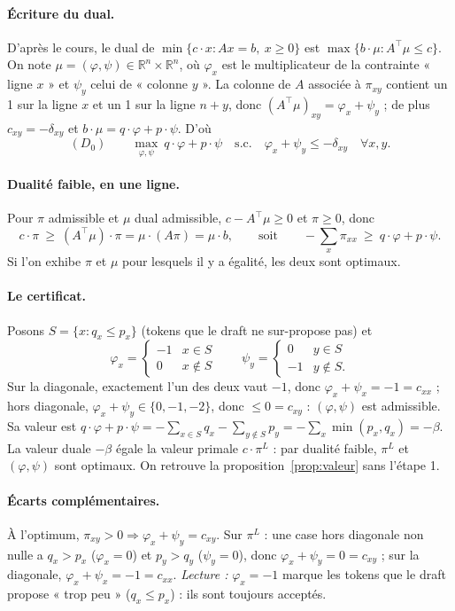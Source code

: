 \documentclass[11pt,a4paper]{article}
\newcommand{\R}{\mathbb{R}}
\theoremstyle{plain}
\theoremstyle{definition}
\begin{document}
\paragraph{Écriture du dual.} D'après le cours, le dual de $\min\{c\cdot x:Ax=b,\ x\ge0\}$ est $\max\{b\cdot\mu:A^\top\mu\le c\}$. On note $\mu=(\varphi,\psi)\in\R^n\times\R^n$, où $\varphi_x$ est le multiplicateur de la contrainte « ligne $x$ » et $\psi_y$ celui de « colonne $y$ ». La colonne de $A$ associée à $\pi_{xy}$ contient un 1 sur la ligne $x$ et un 1 sur la ligne $n+y$, donc $(A^\top\mu)_{xy}=\varphi_x+\psi_y$ ; de plus $c_{xy}=-\delta_{xy}$ et $b\cdot\mu=q\cdot\varphi+p\cdot\psi$. D'où
\[(D_0)\qquad \max_{\varphi,\psi}\ q\cdot\varphi+p\cdot\psi\quad\text{s.c.}\quad \varphi_x+\psi_y\le-\delta_{xy}\quad\forall x,y.\]

\paragraph{Dualité faible, en une ligne.} Pour $\pi$ admissible et $\mu$ dual admissible, $c-A^\top\mu\ge0$ et $\pi\ge0$, donc
\[c\cdot\pi\ \ge\ (A^\top\mu)\cdot\pi=\mu\cdot(A\pi)=\mu\cdot b,\qquad\text{soit}\qquad -\sum_x\pi_{xx}\ \ge\ q\cdot\varphi+p\cdot\psi.\]
Si l'on exhibe $\pi$ et $\mu$ pour lesquels il y a égalité, les deux sont optimaux.

\paragraph{Le certificat.} Posons $S=\{x:q_x\le p_x\}$ (tokens que le draft ne sur-propose pas) et
\[\varphi_x=\begin{cases}-1&x\in S\\0&x\notin S\end{cases}\qquad \psi_y=\begin{cases}0&y\in S\\-1&y\notin S.\end{cases}\]
Sur la diagonale, exactement l'un des deux vaut $-1$, donc $\varphi_x+\psi_x=-1=c_{xx}$ ; hors diagonale, $\varphi_x+\psi_y\in\{0,-1,-2\}$, donc $\le0=c_{xy}$ : $(\varphi,\psi)$ est admissible. Sa valeur est $q\cdot\varphi+p\cdot\psi=-\sum_{x\in S}q_x-\sum_{y\notin S}p_y=-\sum_x\min(p_x,q_x)=-\beta$.
La valeur duale $-\beta$ égale la valeur primale $c\cdot\pi^L$ : par dualité faible, $\pi^L$ et $(\varphi,\psi)$ sont optimaux. On retrouve la proposition~\ref{prop:valeur} sans l'étape 1.

\paragraph{Écarts complémentaires.} À l'optimum, $\pi_{xy}>0\Rightarrow\varphi_x+\psi_y=c_{xy}$. Sur $\pi^L$ : une case hors diagonale non nulle a $q_x>p_x$ ($\varphi_x=0$) et $p_y>q_y$ ($\psi_y=0$), donc $\varphi_x+\psi_y=0=c_{xy}$ ; sur la diagonale, $\varphi_x+\psi_x=-1=c_{xx}$. \emph{Lecture :} $\varphi_x=-1$ marque les tokens que le draft propose « trop peu » ($q_x\le p_x$) : ils sont toujours acceptés.
\end{document}
